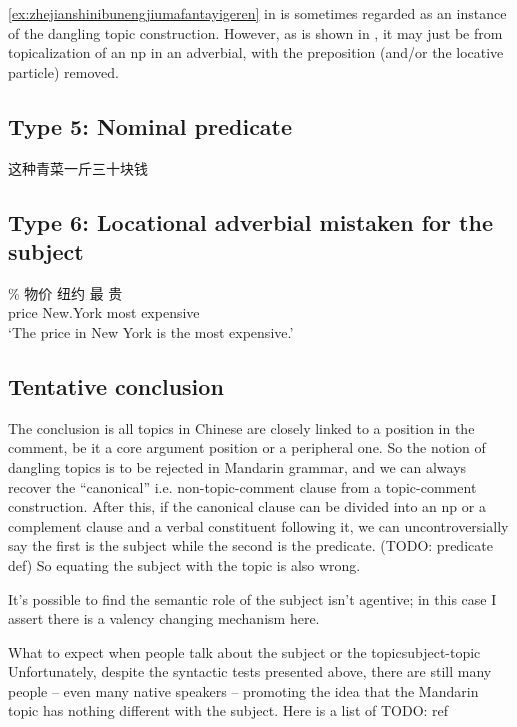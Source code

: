 \documentclass[UTF8, a4paper, oneside, scheme=plain, 12pt]{ctexrep}
\newcommand{\translate}[1]{`#1'}
\begin{document}
\eqref{ex:zhejianshinibunengjiumafantayigeren} in  
is sometimes regarded as an instance of the dangling topic construction.
However, as is shown in ,
it may just be from topicalization of an \acs{np} in an adverbial,
with the preposition (and/or the locative particle) removed.

\subsection{Type 5: Nominal predicate}

\begin{exe}
    \ex 这种青菜一斤三十块钱
\end{exe}

\subsection{Type 6: Locational adverbial mistaken for the subject}

\begin{exe}
    \ex \gll \% 物价 纽约 最 贵  \\
    {} price New.York most expensive \\
    \glt \translate{The price in New York is the most expensive.}
\end{exe}

\subsection{Tentative conclusion}

The conclusion is all topics in Chinese are closely linked to a position in the comment,
be it a core argument position or a peripheral one.
So the notion of dangling topics is to be rejected in Mandarin grammar,
and we can always recover the ``canonical'' i.e. non-topic-comment clause
from a topic-comment construction.
After this, if the canonical clause can be divided into an \acs{np}
or a complement clause and a verbal constituent following it,
we can uncontroversially say the first is the subject while the second is the predicate. (TODO: predicate def)
So equating the subject with the topic is also wrong.

It's possible to find the semantic role of the subject isn't agentive;
in this case I assert there is a valency changing mechanism here.

\begin{infobox}{What to expect when people talk about the subject or the topic}{subject-topic}
    Unfortunately, despite the syntactic tests presented above,
    there are still many people -- even many native speakers -- 
    promoting the idea that the Mandarin topic has nothing different with the subject.
    Here is a list of TODO: ref
\end{infobox}
\end{document}
